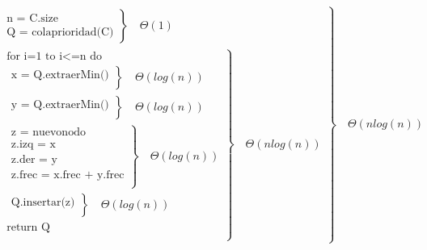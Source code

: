     \begin{equation*}
        \left.
            \begin{aligned}
                \left.
                    \begin{aligned}
                        \text{n = C.size} \\
                        \text{Q = colaprioridad(C)}
                    \end{aligned}
                \right\}
                \quad\Theta(1)
                \\
                \left.
                    \begin{aligned}
                        \text{for i=1 to i<=n do} \\
                        \left.
                            \begin{aligned}
                                \text{x = Q.extraerMin()} \\
                            \end{aligned}
                        \right\}
                        \quad\Theta(log(n))
                        \\
                        \left.
                            \begin{aligned}
                                \text{y = Q.extraerMin()} \\
                            \end{aligned}
                        \right\}
                        \quad\Theta(log(n))
                        \\
                        \left.
                            \begin{aligned}
                                \text{z = nuevonodo} \\
                                \text{z.izq = x} \\
                                \text{z.der = y} \\
                                \text{z.frec = x.frec + y.frec} \\
                            \end{aligned}
                        \right\}
                        \quad\Theta(log(n))
                        \\
                        \left.
                            \begin{aligned}
                                \text{Q.insertar(z)} \\
                            \end{aligned}
                        \right\}
                        \quad\Theta(log(n))
                        \\
                        \text{return Q} \\
                    \end{aligned}
                \right\}
                \quad\Theta(nlog(n))
            \end{aligned}
        \right\}
        \quad\Theta(nlog(n))
    \end{equation*}
    

